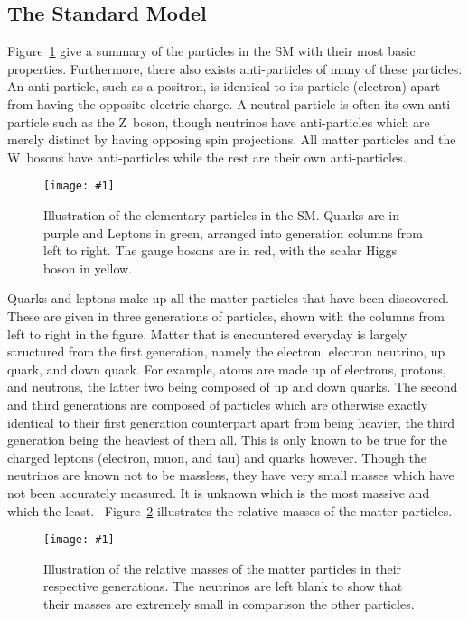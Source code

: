 \documentclass[twocolumn]{article}
\newcommand{\insertFigure}[1]{%
   \texttt{[image: \#1]}%
}
\begin{document}
\subsection{The Standard Model}
Figure~\ref{fig:part} give a summary of the particles in the SM with their most basic properties. Furthermore, there also exists anti-particles of many of these particles. An anti-particle, such as a positron, is identical to its particle (electron) apart from having the opposite electric charge. A neutral particle is often its own anti-particle such as the Z~boson, though neutrinos have anti-particles which are merely distinct by having opposing spin projections. All matter particles and the W~bosons have anti-particles while the rest are their own anti-particles.
\begin{figure}[!h]
	\centering
	\insertFigure{SM.png}
	\caption{Illustration of the elementary particles in the SM. Quarks are in purple and Leptons in green, arranged into generation columns from left to right. The gauge bosons are in red, with the scalar Higgs boson in yellow.~\cite{part}}
	\label{fig:part}
\end{figure}
Quarks and leptons make up all the matter particles that have been discovered. These are given in three generations of particles, shown with the columns from left to right in the figure. Matter that is encountered everyday is largely structured from the first generation, namely the electron, electron neutrino, up quark, and down quark. For example, atoms are made up of electrons, protons, and neutrons, the latter two being composed of up and down quarks. The second and third generations are composed of particles which are otherwise exactly identical to their first generation counterpart apart from being heavier, the third generation being the heaviest of them all. This is only known to be true for the charged leptons (electron, muon, and tau) and quarks however. Though the neutrinos are known not to be massless, they have very small masses which have not been accurately measured. It is unknown which is the most massive and which the least.~\cite{Thompson} Figure~\ref{fig:mass} illustrates the relative masses of the matter particles.
\begin{figure}[!h]
	\centering
	\insertFigure{mass.png}
	\caption{Illustration of the relative masses of the matter particles in their respective generations. The neutrinos are left blank to show that their masses are extremely small in comparison the other particles.~\cite{Thompson}}
	\label{fig:mass}
\end{figure}
\end{document}
